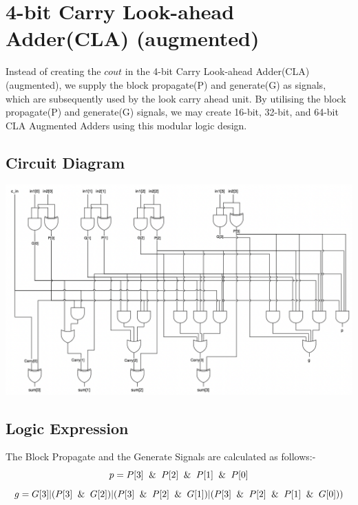 \section{4-bit Carry Look-ahead Adder(CLA) (augmented)}
Instead of creating the $c out$ in the 4-bit Carry Look-ahead Adder(CLA)  (augmented), we supply the block propagate(P) and generate(G) as signals, which are subsequently used by the look carry ahead unit. By utilising the block propagate(P) and generate(G) signals, we may create 16-bit, 32-bit, and 64-bit CLA  Augmented Adders using this modular logic design.
\subsection{Circuit Diagram}
\includegraphics[width = 18cm]{images/cla_4_bit_aug.png}
\subsection{Logic Expression}
The Block Propagate and the Generate Signals are calculated as follows:-
\begin{equation} p = P[3] \And P[2] \And P[1] \And P[0]\end{equation}
\begin{equation} g = G[3] | (P[3] \And G[2]) | (P[3] \And P[2] \And G[1]) | (P[3] \And P[2] \And P[1] \And G[0]) )\end{equation}

